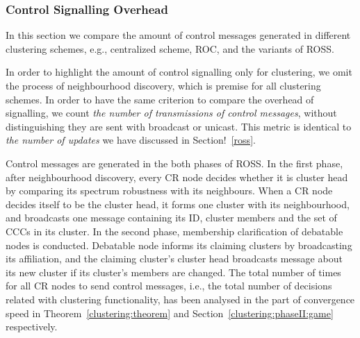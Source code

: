 \documentclass[journal,comsoc]{IEEEtran}
\theoremstyle{mytheoremstyle}
\theoremstyle{mytheoremstyle}
\theoremstyle{mytheoremstyle}
\newcommand{\eg}{e.g., }
\newcommand{\ie}{i.e., }
\begin{document}
\subsubsection{Control Signalling Overhead}

In this section we compare the amount of control messages generated in different clustering schemes, \eg centralized scheme, ROC, and the variants of ROSS.

In order to highlight the amount of control signalling only for clustering, we omit the process of neighbourhood discovery, which is premise for all clustering schemes.%
In order to have the same criterion to compare the overhead of signalling, we count \textit{the number of transmissions of control messages}, without distinguishing they are sent with broadcast or unicast.
This metric is identical to \textit{the number of updates} we have discussed in Section!~\ref{ross}.

Control messages are generated in the both phases of ROSS.
In the first phase, after neighbourhood discovery, every CR node decides whether it is cluster head by comparing its spectrum robustness with its neighbours.
When a CR node decides itself to be the cluster head, it forms one cluster with its neighbourhood, and broadcasts one message containing its ID, cluster members and the set of CCCs in its cluster.
In the second phase, membership clarification of debatable nodes is conducted.
Debatable node informs its claiming clusters by broadcasting its affiliation, and the claiming cluster's cluster head broadcasts message about its new cluster if its cluster's members are changed.
The total number of times for all CR nodes to send control messages, \ie the total number of decisions related with clustering functionality, has been analysed in the part of convergence speed in Theorem~\ref{clustering:theorem} and Section~\ref{clustering:phaseII:game} respectively.
\end{document}
